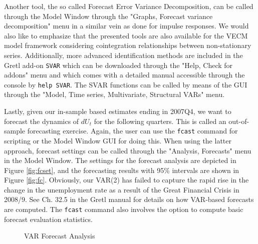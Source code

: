 \documentclass[11pt]{article}
\begin{document}
Another tool, the so called Forecast Error Variance Decomposition, can be called through the Model Window through the "Graphs, Forecast variance decomposition" menu in a similar vein as done for impulse responses. We would also like to emphasize that the presented tools are also available for the VECM model framework considering cointegration relationships between non-stationary series. Additionally, more advanced identification methods are included in the Gretl add-on \texttt{SVAR} which can be downloaded through the "Help, Check for addons" menu and which comes with a detailed manual accessible through the console by \texttt{help SVAR}. The SVAR functions can be called by means of the GUI through the "Model, Time series, Multivariate, Structural VARs" menu.

Lastly, given our in-sample based estimates ending in 2007Q4, we want to forecast the dynamics of $ dU_t $ for the following quarters. This is called an out-of-sample forecasting exercise. Again, the user can use the \texttt{fcast} command for scripting or the Model Window GUI for doing this. When using the latter approach, forecast settings can be called through the "Analysis, Forecasts" menu in the Model Window. The settings for the forecast analysis are depicted in Figure \ref{fig:fcset}, and the forecasting results with 95\% intervals are shown in Figure \ref{fig:fc}. Obviously, our VAR(2) has failed to capture the rapid rise in the change in the unemployment rate as a result of the Great Financial Crisis in 2008/9. See Ch. 32.5 in the Gretl manual for details on how VAR-based forecasts are computed. The \texttt{fcast} command also involves the option to compute basic forecast evaluation statistics.

\begin{figure}[h!]
	\centering
	\caption{VAR Forecast Analysis}
	\label{fig:FC}
\end{figure}
\end{document}
